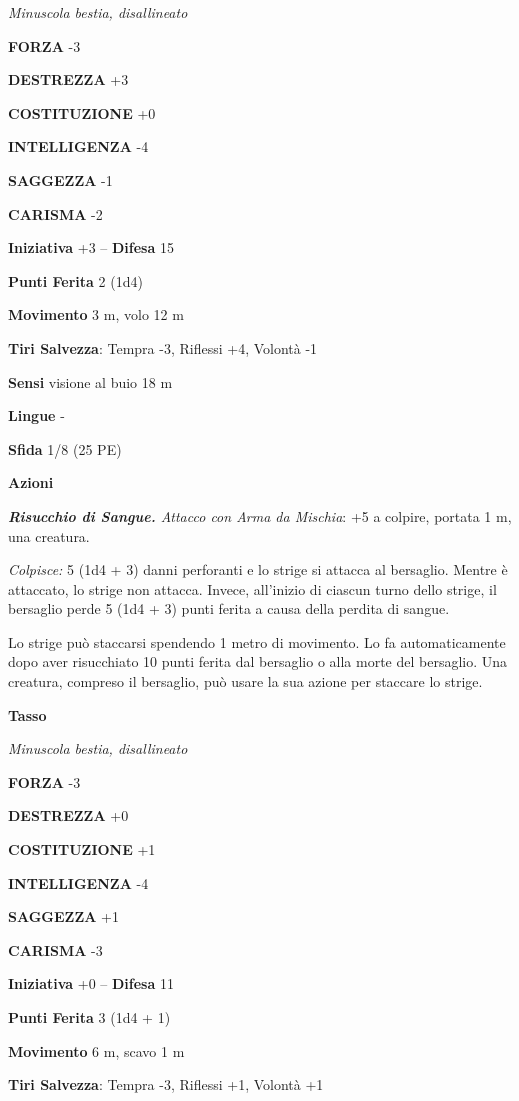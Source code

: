 \begin{multicols}{2}
\emph{Minuscola bestia, disallineato}

\textbf{FORZA} -3

\textbf{DESTREZZA} +3

\textbf{COSTITUZIONE} +0

\textbf{INTELLIGENZA} -4

\textbf{SAGGEZZA} -1

\textbf{CARISMA} -2

\textbf{Iniziativa} +3 -- \textbf{Difesa} 15

\textbf{Punti Ferita} 2 (1d4)

\textbf{Movimento} 3 m, volo 12 m

\textbf{Tiri Salvezza}: Tempra -3, Riflessi +4, Volontà -1

\textbf{Sensi} visione al buio 18 m

\textbf{Lingue} -

\textbf{Sfida} 1/8 (25 PE)

\textbf{Azioni}

\emph{\textbf{Risucchio di Sangue.} Attacco con Arma da Mischia}: +5 a colpire, portata 1 m, una creatura.

\emph{Colpisce:} 5 (1d4 + 3) danni perforanti e lo strige si attacca al bersaglio. Mentre è attaccato, lo strige non attacca. Invece, all'inizio di ciascun turno dello strige, il bersaglio perde 5 (1d4 + 3) punti ferita a causa della perdita di sangue.

Lo strige può staccarsi spendendo 1 metro di movimento. Lo fa automaticamente dopo aver risucchiato 10 punti ferita dal bersaglio o alla morte del bersaglio. Una creatura, compreso il bersaglio, può usare la sua azione per staccare lo strige.

\medskip\textbf{Tasso}

\emph{Minuscola bestia, disallineato}

\textbf{FORZA} -3

\textbf{DESTREZZA} +0

\textbf{COSTITUZIONE} +1

\textbf{INTELLIGENZA} -4

\textbf{SAGGEZZA} +1

\textbf{CARISMA} -3

\textbf{Iniziativa} +0 -- \textbf{Difesa} 11

\textbf{Punti Ferita} 3 (1d4 + 1)

\textbf{Movimento} 6 m, scavo 1 m

\textbf{Tiri Salvezza}: Tempra -3, Riflessi +1, Volontà +1


\end{multicols}
